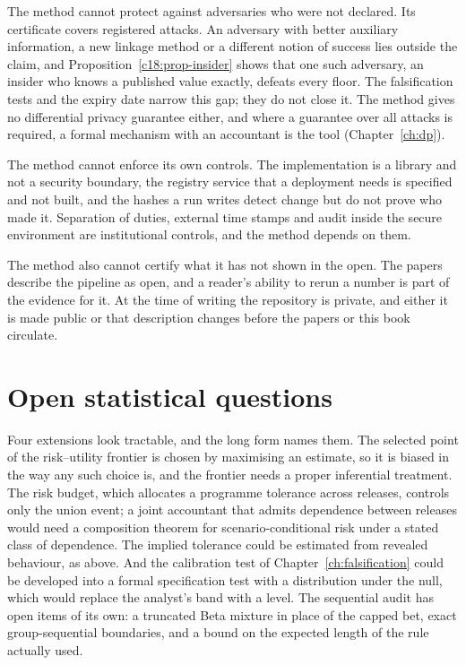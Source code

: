 The method cannot protect against adversaries who were not declared. Its certificate
covers registered attacks. An adversary with better auxiliary information, a new
linkage method or a different notion of success lies outside the claim, and
Proposition~\ref{c18:prop-insider} shows that one such adversary, an insider who knows a
published value exactly, defeats every floor. The falsification tests and the expiry
date narrow this gap; they do not close it. The method gives no differential privacy
guarantee either, and where a guarantee over all attacks is required, a formal
mechanism with an accountant is the tool (Chapter~\ref{ch:dp}).

The method cannot enforce its own controls. The implementation is a library and not a
security boundary, the registry service that a deployment needs is specified and not
built, and the hashes a run writes detect change but do not prove who made it.
Separation of duties, external time stamps and audit inside the secure environment are
institutional controls, and the method depends on them.

The method also cannot certify what it has not shown in the open. The papers describe
the pipeline as open, and a reader's ability to rerun a number is part of the
evidence for it. At the time of writing the repository is private, and either it is
made public or that description changes before the papers or this book circulate.

\section{Open statistical questions}

Four extensions look tractable, and the long form names them. The selected point of
the risk--utility frontier is chosen by maximising an estimate, so it is biased in the
way any such choice is, and the frontier needs a proper inferential treatment. The
risk budget, which allocates a programme tolerance across releases, controls only the
union event; a joint accountant that admits dependence between releases would need a
composition theorem for scenario-conditional risk under a stated class of dependence.
The implied tolerance could be estimated from revealed behaviour, as above. And the
calibration test of Chapter~\ref{ch:falsification} could be developed into a formal
specification test with a distribution under the null, which would replace the
analyst's band with a level. The sequential audit has open items of its own: a
truncated Beta mixture in place of the capped bet, exact group-sequential boundaries,
and a bound on the expected length of the rule actually used.

